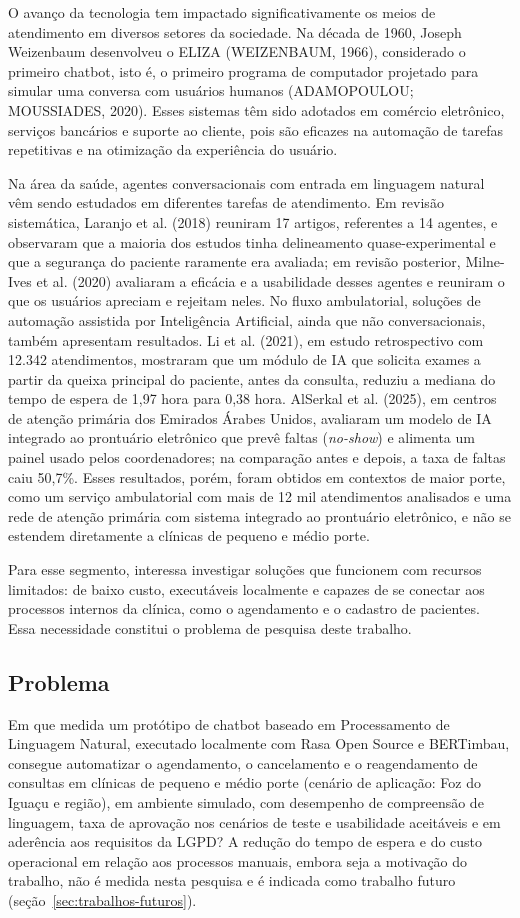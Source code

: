 \documentclass[12pt,a4paper]{extarticle}
\begin{document}
O avanço da tecnologia tem impactado significativamente os meios de atendimento em diversos setores da sociedade. Na década de 1960, Joseph Weizenbaum desenvolveu o ELIZA (WEIZENBAUM, 1966), considerado o primeiro chatbot, isto é, o primeiro programa de computador projetado para simular uma conversa com usuários humanos (ADAMOPOULOU; MOUSSIADES, 2020). Esses sistemas têm sido adotados em comércio eletrônico, serviços bancários e suporte ao cliente, pois são eficazes na automação de tarefas repetitivas e na otimização da experiência do usuário.

Na área da saúde, agentes conversacionais com entrada em linguagem natural vêm sendo estudados em diferentes tarefas de atendimento. Em revisão sistemática, Laranjo et al. (2018) reuniram 17 artigos, referentes a 14 agentes, e observaram que a maioria dos estudos tinha delineamento quase-experimental e que a segurança do paciente raramente era avaliada; em revisão posterior, Milne-Ives et al. (2020) avaliaram a eficácia e a usabilidade desses agentes e reuniram o que os usuários apreciam e rejeitam neles. No fluxo ambulatorial, soluções de automação assistida por Inteligência Artificial, ainda que não conversacionais, também apresentam resultados. Li et al. (2021), em estudo retrospectivo com 12.342 atendimentos, mostraram que um módulo de IA que solicita exames a partir da queixa principal do paciente, antes da consulta, reduziu a mediana do tempo de espera de 1,97 hora para 0,38 hora. AlSerkal et al. (2025), em centros de atenção primária dos Emirados Árabes Unidos, avaliaram um modelo de IA integrado ao prontuário eletrônico que prevê faltas (\textit{no-show}) e alimenta um painel usado pelos coordenadores; na comparação antes e depois, a taxa de faltas caiu 50,7\%. Esses resultados, porém, foram obtidos em contextos de maior porte, como um serviço ambulatorial com mais de 12 mil atendimentos analisados e uma rede de atenção primária com sistema integrado ao prontuário eletrônico, e não se estendem diretamente a clínicas de pequeno e médio porte. 

Para esse segmento, interessa investigar soluções que funcionem com recursos limitados: de baixo custo, executáveis localmente e capazes de se conectar aos processos internos da clínica, como o agendamento e o cadastro de pacientes. Essa necessidade constitui o problema de pesquisa deste trabalho.

\subsection{Problema}
Em que medida um protótipo de chatbot baseado em Processamento de Linguagem Natural, executado localmente com Rasa Open Source e BERTimbau, consegue automatizar o agendamento, o cancelamento e o reagendamento de consultas em clínicas de pequeno e médio porte (cenário de aplicação: Foz do Iguaçu e região), em ambiente simulado, com desempenho de compreensão de linguagem, taxa de aprovação nos cenários de teste e usabilidade aceitáveis e em aderência aos requisitos da LGPD? A redução do tempo de espera e do custo operacional em relação aos processos manuais, embora seja a motivação do trabalho, não é medida nesta pesquisa e é indicada como trabalho futuro (seção~\ref{sec:trabalhos-futuros}).
\end{document}
